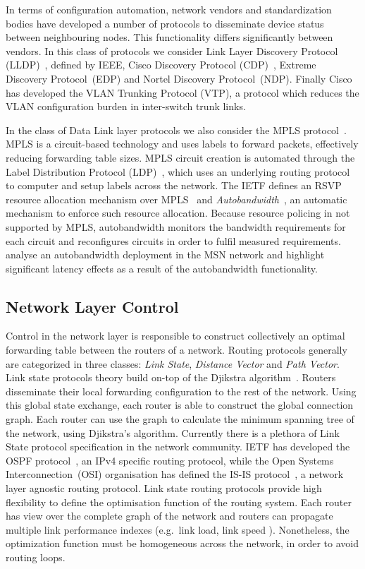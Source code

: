 In terms of configuration automation, network vendors and standardization bodies
have developed a number of protocols to disseminate device status between
neighbouring nodes. This functionality differs significantly between vendors.
In this class of protocols we consider Link Layer Discovery Protocol
(LLDP)~, defined by IEEE, Cisco Discovery Protocol
(CDP)~,  Extreme Discovery Protocol~(EDP) and Nortel Discovery
Protocol~(NDP). Finally Cisco has developed the VLAN Trunking Protocol (VTP), a
protocol which reduces the VLAN configuration burden in inter-switch trunk
links.

In the class of Data Link layer protocols we also consider the MPLS
protocol~.  MPLS is a circuit-based technology and uses labels
to forward packets, effectively reducing forwarding table sizes.  MPLS circuit
creation is automated through the Label Distribution Protocol
(LDP)~, which uses an underlying routing protocol to computer
and setup labels across the network. The IETF defines an RSVP resource
allocation mechanism over MPLS~ and
\textit{Autobandwidth}~, an automatic mechanism to enforce
such resource allocation.  Because resource policing in not supported by MPLS,
autobandwidth monitors the bandwidth requirements for each circuit and
reconfigures circuits in order to fulfil measured requirements.
 analyse an autobandwidth deployment in the MSN network and
highlight significant latency effects as a result of the autobandwidth
functionality.


\subsection{Network Layer Control}

Control in the network layer is responsible to construct collectively an optimal
forwarding table between the routers of a network.  Routing protocols generally
are categorized in three classes: \emph{Link State}, \emph{Distance Vector} and
\emph{Path Vector}. Link state protocols theory build on-top of the Djikstra
algorithm~. Routers disseminate their local forwarding
configuration to the rest of the network.  Using this global state exchange,
each router is able to construct the global connection graph. Each router can
use the graph to calculate the minimum spanning tree of the network, using
Djikstra's algorithm.  Currently there is a plethora of Link State protocol
specification in the network community.  IETF has developed the OSPF
protocol~, an IPv4 specific routing protocol, while the Open
Systems Interconnection~(OSI) organisation has defined the IS-IS
protocol~, a network layer agnostic routing protocol.  Link
state routing protocols provide high flexibility to define the optimisation
function of the routing system.  Each router has view over the complete graph of
the network and routers can propagate multiple link performance indexes
(e.g.~link load, link speed ).  Nonetheless, the optimization function must be
homogeneous across the network, in order to avoid routing loops.

